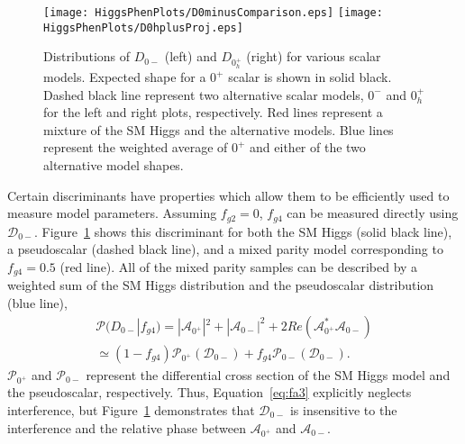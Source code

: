 \begin{figure}
\begin{center}
\texttt{[image: HiggsPhenPlots/D0minusComparison.eps]}
\texttt{[image: HiggsPhenPlots/D0hplusProj.eps]}
\caption{Distributions of $D_{0-}$ (left) and $D_{0_h^+}$ (right) for 
various scalar models.  Expected shape for a $0^+$ scalar is
shown in solid black.  Dashed black line represent two alternative
scalar models, $0^-$ and $0^+_h$ for the left and right plots,
respectively.  
Red lines represent a mixture of the SM Higgs and the alternative
models.  Blue lines represent the weighted average
of $0^+$ and either of the two alternative model shapes.}
\label{fig:fa3Comparison}
\end{center}
\end{figure}

Certain discriminants have properties which allow them to be efficiently
used to measure model parameters.  Assuming $f_{g2}=0$,
$f_{g4}$ can be measured directly using $\mathscr{D}_{0-}$.  
Figure~\ref{fig:fa3Comparison} shows this discriminant for
both the SM Higgs (solid black line), a pseudoscalar 
(dashed black line), and a mixed parity 
model corresponding to $f_{g4}=0.5$ (red line).  All of the mixed
parity samples can be described by a weighted sum of the SM Higgs
distribution and the 
pseudoscalar distribution (blue line), 
\begin{equation}
\begin{split}
\mathscr{P}(D_{0-}|f_{g4}) = |\mathscr{A}_{0^+}|^2 + |\mathscr{A}_{0-}|^2 + 2Re(\mathscr{A}_{0^+}^*\mathscr{A}_{0-}) \\ 
\simeq (1-f_{g4})\mathscr{P}_{0^+}(\mathscr{D}_{0-})+f_{g4}\mathscr{P}_{0-}(\mathscr{D}_{0-}).
\label{eq:fa3}
\end{split}
\end{equation}
$\mathscr{P}_{0^+}$ and $\mathscr{P}_{0-}$ represent the differential cross section of
the SM Higgs model and the pseudoscalar, respectively.
Thus, Equation~\ref{eq:fa3} explicitly neglects interference, but
Figure~\ref{fig:fa3Comparison} demonstrates that $\mathscr{D}_{0-}$ is insensitive to
the interference and the relative phase between $\mathscr{A}_{0^+}$ and
$\mathscr{A}_{0-}$.  


